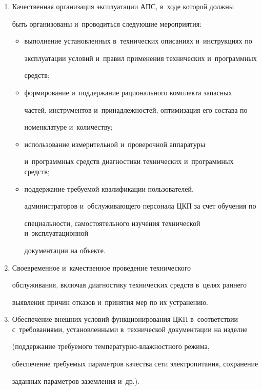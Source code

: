   \begin{enumerate}[1.]

  \item Качественная организация эксплуатации АПС, в~ходе которой должны 

быть организованы и~проводиться следующие мероприятия:

  \begin{itemize}

  \item выполнение установленных в~технических описаниях и~инструкциях по 

эксплуатации условий и~правил применения технических и~программных 

средств;

  \item формирование и~поддержание рационального комплекта запасных 

час\-тей, инструментов и~принадлежностей, оптимизация его состава по 

номенклатуре и~количеству;

  \item  использование измерительной и~проверочной аппаратуры 

и~программных средств диагностики технических и~программных средств;

  \item  поддержание требуемой квалификации пользователей, 

администраторов и~обслуживающего персонала ЦКП за счет обучения по 

специальности, самостоятельного изучения технической и~эксплуатационной 

документации на объекте.

  \end{itemize}

  \item  Своевременное и~качественное проведение технического 

обслуживания, включая диагностику технических средств в~целях раннего 

выявления причин отказов и~принятия мер по их устранению.

  \item  Обеспечение внешних условий функционирования ЦКП в~соответствии с~требованиями, установленными в~технической документации на изделие 

(поддержание требуемого тем\-пе\-ра\-тур\-но-влаж\-ност\-но\-го режима, 

обеспечение требуемых параметров качества сети электропитания, сохранение 

заданных параметров заземления и~др.).

  \end{enumerate}

